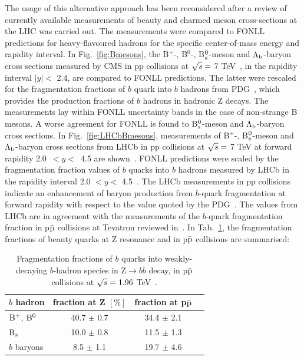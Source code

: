 The usage of this alternative approach has been reconsidered after a
review of currently available measurements of beauty and 
charmed meson cross-sections at the LHC was carried out. The measurements 
were compared to FONLL predictions for heavy-flavoured hadrons 
for the specific center-of-mass energy and rapidity interval.
In Fig.~\ref{fig:Bmesons}, the B$^{+}$-, B$^{0}$-, B$^0_{\rm s}$-meson and 
$\Lambda_{\rm b}$-baryon cross sections measured by CMS in pp collisions 
at $\sqrt{s} = $ 7 TeV~\cite{Khachatryan:2011mk,Chatrchyan:2011pw,Chatrchyan:2011vh,Chatrchyan:2012xg},
in the rapidity interval $|y| <$ 2.4, are compared to FONLL predictions. 
The latter were rescaled for the fragmentation fractions of $b$ quark into 
$b$ hadrons from PDG~\cite{Patrignani:2016xqp}, which provides the production 
fractions of $b$ hadrons in hadronic Z decays.
The measurements lay within FONLL uncertainty bands in the case 
of non-strange B mesons. A worse agreement for FONLL is found to B$^0_{\rm s}$-meson
and $\Lambda_{\rm b}$-baryon cross sections.
In Fig.~\ref{fig:LHCbBmesons}, measurements of B$^{+}$-, B$^0_{\rm s}$-meson
and $\Lambda_{\rm b}$-baryon cross sections from
LHCb in pp collisions at $\sqrt{s} =$ 7 TeV at forward rapidity 
\mbox{2.0 $< y <$ 4.5} are shown~\cite{Aaij:2013noa,Aaij:2015fea}.
FONLL predictions were scaled by the fragmentation fraction values 
of $b$ quarks into $b$ hadrons measured by LHCb in the rapidity interval 
2.0 $< y <$ 4.5~\cite{Aaij:2011jp}. The LHCb measurements in pp collisions indicate an 
enhancement of baryon production from $b$-quark fragmentation at forward rapidity with respect to 
the value quoted by the PDG~\cite{Patrignani:2016xqp}. The values from LHCb are in agreement with the measurements
of the $b$-quark fragmentation fraction in p$\bar{\rm p}$ collisions at Tevatron reviewed in~\cite{Patrignani:2016xqp}.
In Tab.~\ref{tab:fragFrac}, the fragmentation fractions of beauty quarks at Z resonance and
in p$\bar{\rm p}$ collisions are summarised:\\
\begin{table}[!h]
\centering
\begin{tabular}{l|ccc}
 \hline 
\hline
$b$ hadron & fraction at Z $[\%]$  & fraction at p$\bar{\rm p}$ \\
\hline 
${\rm B}^{+}$, ${\rm B}^{0}$    &     40.7 $\pm$ 0.7   & 34.4 $\pm$ 2.1 \\
${\rm B}_{s}$                 &     10.0 $\pm$ 0.8   & 11.5 $\pm$ 1.3 \\
$b$ baryons          &       8.5 $\pm$ 1.1   & 19.7 $\pm$ 4.6 \\
 \hline 
\hline
\end{tabular}
\caption{Fragmentation fractions of $b$ quarks into weakly-decaying $b$-hadron species in Z$ \rightarrow b\bar{b}$ decay, in p$\bar{\rm p}$ collisions at $\sqrt{s} = 1.96$ TeV~\cite{Patrignani:2016xqp}.}
\label{tab:fragFrac}
\end{table}




